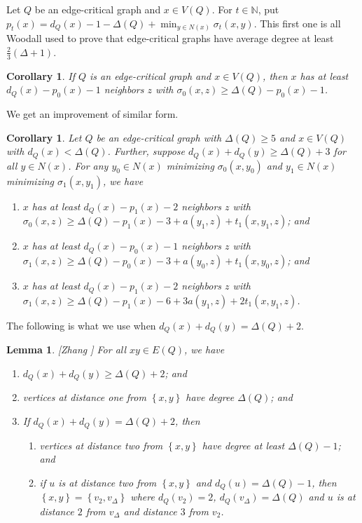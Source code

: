 \documentclass[12pt,reqno]{amsart}
\theoremstyle{plain}
\newtheorem{lem}[thm]{Lemma}
\newtheorem{cor}[thm]{Corollary}
\theoremstyle{definition}
\theoremstyle{remark}
\newcommand{\IN}{\mathbb{N}}
\newcommand{\set}[1]{\left\{ #1 \right\}}
\begin{document}
Let $Q$ be an edge-critical graph and $x \in V(Q)$. For $t \in \IN$, put $p_t(x) = d_Q(x) - 1 - \Delta(Q) + \min_{y \in N(x)} \sigma_t(x,y)$.  This first one is all Woodall \cite{woodall2007average} used to prove that
edge-critical graphs have average degree at least $\frac23 (\Delta + 1)$.

\begin{cor}\label{SigmaZeroMin}
If $Q$ is an edge-critical graph and $x \in V(Q)$, then $x$ has at least $d_Q(x) - p_0(x) - 1$ neighbors $z$ with $\sigma_0(x,z) \ge \Delta(Q) - p_0(x) - 1$.
\end{cor}

We get an improvement of similar form.

\begin{cor}\label{SigmaOneMin}
Let $Q$ be an edge-critical graph with $\Delta(Q) \ge 5$ and $x \in V(Q)$ with $d_Q(x) < \Delta(Q)$.  Further, suppose $d_Q(x) + d_Q(y) \ge \Delta(Q) + 3$ for all $y \in N(x)$.  For any $y_0 \in N(x)$ minimizing $\sigma_0(x,y_0)$ and $y_1 \in N(x)$ minimizing $\sigma_1(x,y_1)$, we have
\begin{enumerate}
\item $x$ has at least $d_Q(x) - p_1(x) - 2$ neighbors $z$ with $\sigma_0(x,z) \ge \Delta(Q) - p_1(x) - 3 + a(y_1, z) + t_1(x, y_1, z)$; and
\item $x$ has at least $d_Q(x) - p_0(x) - 1$ neighbors $z$ with $\sigma_1(x,z) \ge \Delta(Q) - p_0(x) - 3 + a(y_0, z) + t_1(x, y_0, z)$; and
\item $x$ has at least $d_Q(x) - p_1(x) - 2$ neighbors $z$ with $\sigma_1(x,z) \ge \Delta(Q) - p_1(x) - 6 + 3a(y_1, z) + 2t_1(x, y_1, z)$.
\end{enumerate}
\end{cor}

The following is what we use when $d_Q(x) + d_Q(y) = \Delta(Q) + 2$.

\begin{lem}\label{ZhangLemma}[Zhang \cite{zhang2000every}]
For all $xy \in E(Q)$, we have

\begin{enumerate}
\item $d_Q(x) + d_Q(y) \ge \Delta(Q) + 2$; and
\item vertices at distance one from $\set{x, y}$ have degree $\Delta(Q)$; and
\item If $d_Q(x) + d_Q(y) = \Delta(Q) + 2$, then
	\begin{enumerate}
	\item vertices at distance two from $\set{x, y}$ have degree at least $\Delta(Q) - 1$; and
	\item if $u$ is at distance two from $\set{x, y}$ and $d_Q(u) = \Delta(Q) - 1$, then $\set{x, y} = \set{v_2, v_\Delta}$ where $d_Q(v_2) = 2$, $d_Q(v_\Delta) = \Delta(Q)$ and
	$u$ is at distance $2$ from $v_\Delta$ and distance $3$ from $v_2$.
	\end{enumerate}
\end{enumerate}
\end{lem}
\end{document}
